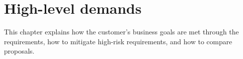 \documentclass[Main]{subfiles}
\begin{document}
\chapter{High-level demands}
This chapter explains how the customer's business goals are met through the requirements, how to mitigate high-risk requirements, and how to compare proposals.


%
%
%
%
\end{document}
